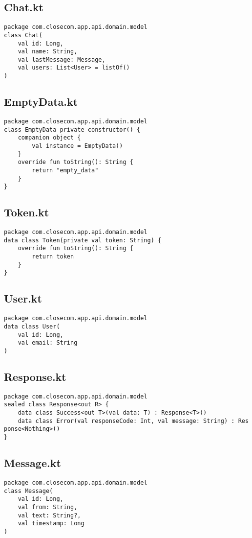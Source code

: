 \documentclass[listing]{espd}
\begin{document}
\subsection{Chat.kt}
\begin{verbatim}
package com.closecom.app.api.domain.model
class Chat(
    val id: Long,
    val name: String,
    val lastMessage: Message,
    val users: List<User> = listOf()
)
\end{verbatim}

\subsection{EmptyData.kt}
\begin{verbatim}
package com.closecom.app.api.domain.model
class EmptyData private constructor() {
    companion object {
        val instance = EmptyData()
    }
    override fun toString(): String {
        return "empty_data"
    }
}
\end{verbatim}

\subsection{Token.kt}
\begin{verbatim}
package com.closecom.app.api.domain.model
data class Token(private val token: String) {
    override fun toString(): String {
        return token
    }
}
\end{verbatim}

\subsection{User.kt}
\begin{verbatim}
package com.closecom.app.api.domain.model
data class User(
    val id: Long,
    val email: String
)
\end{verbatim}

\subsection{Response.kt}
\begin{verbatim}
package com.closecom.app.api.domain.model
sealed class Response<out R> {
    data class Success<out T>(val data: T) : Response<T>()
    data class Error(val responseCode: Int, val message: String) : Res
ponse<Nothing>()
}
\end{verbatim}

\subsection{Message.kt}
\begin{verbatim}
package com.closecom.app.api.domain.model
class Message(
    val id: Long,
    val from: String,
    val text: String?,
    val timestamp: Long
)
\end{verbatim}
\end{document}

